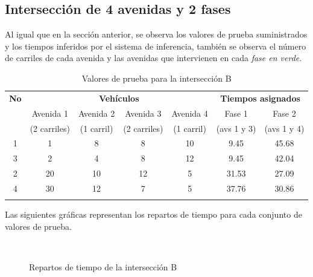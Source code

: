 \newpage
\subsection{Intersección de 4 avenidas y 2 fases}
Al igual que en la sección anterior, se observa los valores de prueba suministrados y los tiempos inferidos por el sistema de inferencia, también se observa el número de carriles de cada avenida y las avenidas que intervienen en cada \emph{fase en verde}.
\begin{longtable}[c]{ccccccc} \toprule
	\textbf{No} &\multicolumn{4}{c}{\textbf{Vehículos}} & \multicolumn{2}{c}{\textbf{Tiempos asignados}} \\[0.2cm]
	&  Avenida 1 & Avenida 2 &  Avenida 3 & Avenida 4 & Fase 1 & Fase 2 \\[0cm]
	&{\scriptsize(2 carriles)}&{\scriptsize (1 carril)} &{\scriptsize (2 carriles)} & {\scriptsize (1 carril)} &{\scriptsize (avs 1 y 3)} &{\scriptsize(avs 1 y 4)} \\[0.1cm]\midrule
	1 & 1 & 8 & 8 & 10 & 9.45 &45.68\\
	3 & 2 & 4 & 8 & 12 & 9.45 & 42.04\\
	2 & 20 & 10 & 12 & 5 & 31.53 & 27.09\\
	4 & 30 & 12 & 7 & 5 & 37.76& 30.86 \\\bottomrule
	\caption{Valores de prueba para la intersección B}
\end{longtable}

Las siguientes gráficas representan los repartos de tiempo para cada conjunto de valores de prueba.
\begin{figure}[H]
	\centering
	\\
	\caption{Repartos de tiempo de la intersección B}
\end{figure}




